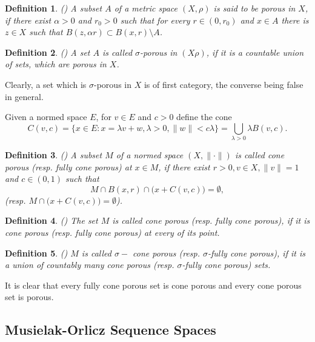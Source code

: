 \documentclass[12pt]{article}
\theoremstyle{thmstyleone}%
\theoremstyle{thmstyletwo}%
\theoremstyle{thmstylethree}%
\newtheorem{definition}{Definition}%
\begin{document}
\begin{definition}\label{definition:3}(\cite{Phelps})%
	A subset $A$ of a metric space $(X,\rho)$ is said to be porous in $X$, if there exist  $\alpha >0$ and $r_0 >0$ such that 
	for every $r\in (0,r_0)$ and $x \in  A$ there is $z\in  X$ such that $B(z,\alpha r)\subset B(x,r)\setminus A$.  
\end{definition}

\begin{definition}\label{definition:4}(\cite{Phelps})%
	A set  $A$ is called  $\sigma$-porous in $(X\rho)$, if it is a countable union of sets, which are porous in $X$.
\end{definition}

Clearly, a set which is $\sigma $-porous in $ X$ is of first category, the converse being false in general. 

Given a normed space $E$, for $v\in E$ and $c>0$ define the cone
$$
C(v,c)=\{x\in E: x=\lambda v+w, \lambda>0, \| w\| <c\lambda \} = \bigcup _{\lambda>0}\lambda {B(v,c).}
$$

\begin{definition}\label{definition:5}(\cite{Ge})%
	A subset $M$ of a normed space $(X,\|\cdot\|)$ is called cone porous (resp. fully cone porous) at $x\in M$, if there 
	exist $r>0, v\in X, \|v\| =1$ and $c\in (0,1)$ such that 
	$$
	M\cap B(x,r)\cap \big(x+ {C(v,c)}\big)=\emptyset,
	$$
	(resp. $M\cap  \big(x+ {C(v,c)}\big) = \emptyset$).
\end{definition}

\begin{definition}\label{definition:6}(\cite{Ge})%
	The set $M$ is called cone porous (resp. fully cone porous), if it is cone porous (resp. fully cone porous) at every of its point. 
\end{definition}

\begin{definition}\label{definition:7}(\cite{Ge})%
	$M$ is called $\sigma-$ cone porous (resp. $\sigma$-fully cone porous), if it is a union of countably many cone porous (resp. $\sigma$-fully cone porous) sets.
\end{definition}

It is clear that every fully cone porous set is cone porous and every cone porous set is porous. 

\subsection{Musielak-Orlicz Sequence Spaces}
\end{document}
